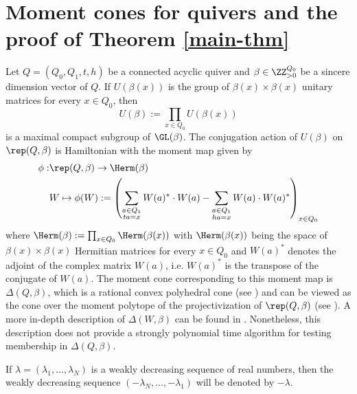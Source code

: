 \section{Moment cones for quivers and the proof of Theorem \ref{main-thm}}\label{moment-cones-proof-thm-1-sec}
Let $Q=(Q_0,Q_1,t,h)$ be a connected acyclic quiver and $\beta \in \ZZ_{>0}^{Q_0}$ be a sincere dimension vector of $Q$. If $U(\beta(x))$ is the group of $\beta(x) \times \beta(x)$ unitary matrices for every $x \in Q_0$, then 
\[
U(\beta) := \prod_{x \in Q_0} U(\beta(x))
\]
is a maximal compact subgroup of $\GL(\beta)$. The conjugation action of $U(\beta)$ on $\rep(Q,\beta)$ is Hamiltonian with the moment map given by 
\begin{align*}
\phi: & \rep(Q,\beta) \to \Herm(\beta)\\
& W \mapsto \phi(W) := \left( \sum_{\substack{a \in Q_1 \\ ta=x}} W(a)^* \cdot W(a) - \sum_{\substack{a \in Q_1 \\ ha=x}} W(a) \cdot W(a)^*\right)_{x \in Q_0}
\end{align*}
where $\Herm(\beta) := \prod_{x \in Q_0} \Herm(\beta(x))$ with $\Herm(\beta(x))$ being the space of $\beta(x) \times \beta(x)$ Hermitian matrices for every $x \in Q_0$ and  $W(a)^*$ denotes the adjoint of the complex matrix $W(a)$, i.e. $W(a)^*$ is the transpose of the conjugate of $W(a)$. The moment cone corresponding to this moment map is $\Delta(Q,\beta)$, which is a rational convex polyhedral cone (see \cite[Theorem 4.9]{Sj}) and  can be viewed as the cone over the moment polytope of the projectivization of $\rep(Q,\beta)$ (see \cite[Corollary 4.11]{Sj}). A more in-depth description of $\Delta(W, \beta)$ can be found in \cite{Bal-Ver-Wal-2023}. Nonetheless, this description does not provide a strongly polynomial time algorithm for testing membership in $\Delta(Q, \beta)$.

If $\lambda=(\lambda_1, \ldots, \lambda_N)$ is a weakly decreasing sequence of real numbers, then the weakly decreasing sequence $(-\lambda_N, \ldots, -\lambda_1)$ will be denoted by $-\lambda$. 

